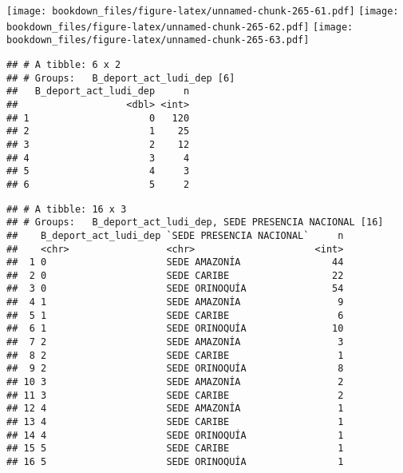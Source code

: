\documentclass[]{article}
\theoremstyle{definition}
\theoremstyle{definition}
\theoremstyle{definition}
\theoremstyle{remark}
\begin{document}
\texttt{[image: bookdown\_files/figure-latex/unnamed-chunk-265-61.pdf]}
\texttt{[image: bookdown\_files/figure-latex/unnamed-chunk-265-62.pdf]}
\texttt{[image: bookdown\_files/figure-latex/unnamed-chunk-265-63.pdf]}

\begin{verbatim}
## # A tibble: 6 x 2
## # Groups:   B_deport_act_ludi_dep [6]
##   B_deport_act_ludi_dep     n
##                   <dbl> <int>
## 1                     0   120
## 2                     1    25
## 3                     2    12
## 4                     3     4
## 5                     4     3
## 6                     5     2
\end{verbatim}

\begin{verbatim}
## # A tibble: 16 x 3
## # Groups:   B_deport_act_ludi_dep, SEDE PRESENCIA NACIONAL [16]
##    B_deport_act_ludi_dep `SEDE PRESENCIA NACIONAL`     n
##    <chr>                 <chr>                     <int>
##  1 0                     SEDE AMAZONÍA                44
##  2 0                     SEDE CARIBE                  22
##  3 0                     SEDE ORINOQUÍA               54
##  4 1                     SEDE AMAZONÍA                 9
##  5 1                     SEDE CARIBE                   6
##  6 1                     SEDE ORINOQUÍA               10
##  7 2                     SEDE AMAZONÍA                 3
##  8 2                     SEDE CARIBE                   1
##  9 2                     SEDE ORINOQUÍA                8
## 10 3                     SEDE AMAZONÍA                 2
## 11 3                     SEDE CARIBE                   2
## 12 4                     SEDE AMAZONÍA                 1
## 13 4                     SEDE CARIBE                   1
## 14 4                     SEDE ORINOQUÍA                1
## 15 5                     SEDE CARIBE                   1
## 16 5                     SEDE ORINOQUÍA                1
\end{verbatim}
\end{document}
